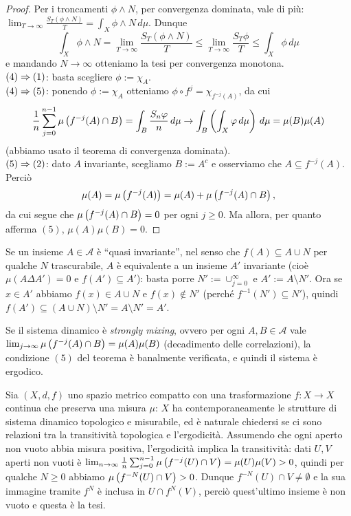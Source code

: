 \begin{proof}
Per i troncamenti $\phi\wedge N$, per convergenza dominata, vale di più: $\lim_{T\to\infty}\frac{S_T(\phi\wedge N)}{T}=\int_X \phi\wedge N\,d\mu$. Dunque
\[ \int_X\phi\wedge N=\lim_{T\to\infty}\frac{S_T(\phi\wedge N)}{T}\le\lim_{T\to\infty}\frac{S_T\phi}{T}\le \int_X\phi\,d\mu \]
e mandando $N\to\infty$ otteniamo la tesi per convergenza monotona. \\
$(4)\Rightarrow (1)$: basta scegliere $\phi:=\chi_A$. \\
$(4)\Rightarrow(5)$: ponendo $\phi:=\chi_A$ otteniamo $\phi\circ f^j=\chi_{f^{-j}(A)}$, da cui
\[ \frac{1}{n}\sum_{j=0}^{n-1}\mu\left(f^{-j}(A)\cap B\right)=\int_B\frac{S_n\varphi}{n}\,d\mu\to\int_B\left(\int_X\varphi\,d\mu\right)\,d\mu=\mu(B)\mu(A) \]
(abbiamo usato il teorema di convergenza dominata). \\
$(5)\Rightarrow (2)$: dato $A$ invariante, scegliamo $B:=A^c$ e osserviamo che $A\subseteq f^{-j}(A)$. Perciò
\[ \mu(A)=\mu\left(f^{-j}(A)\right)=\mu(A)+\mu\left(f^{-j}(A)\cap B\right), \]
da cui segue che $\mu\left(f^{-j}(A)\cap B\right)=0$ per ogni $j\ge 0$. Ma allora, per quanto afferma $(5)$, $\mu(A)\mu(B)=0$.
\end{proof}

\begin{oss}Se un insieme $A\in\mathcal{A}$ è ``quasi invariante'', nel senso che $f(A)\subseteq A\cup N$ per qualche
$N$ trascurabile, $A$ è equivalente a un insieme $A'$ invariante (cioè $\mu(A\Delta A')=0$ e $f(A')\subseteq A'$):
basta porre $N':=\cup_{j=0}^\infty$ e $A':=A\setminus N'$. Ora se $x\in A'$ abbiamo
$f(x)\in A\cup N$ e $f(x)\nin N'$ (perché $f^{-1}(N')\subseteq N'$), quindi $f(A')\subseteq (A\cup N)\setminus N'=A\setminus N'=A'$.
\end{oss}

\begin{oss}Se il sistema dinamico è \emph{strongly mixing}, ovvero per ogni $A,B\in\mathcal{A}$ vale
$\lim_{j\to\infty}\mu\left(f^{-j}(A)\cap B\right)=\mu(A)\mu(B)$ (\lcap decadimento delle correlazioni\rcap),
la condizione $(5)$ del teorema è banalmente verificata, e quindi il sistema è ergodico.
\end{oss}

\begin{oss}[facoltativa]Sia $(X,d,f)$ uno spazio metrico compatto con una trasformazione $f:X\to X$ continua che preserva
una misura $\mu$: $X$ ha contemporaneamente le strutture di sistema dinamico topologico
e misurabile, ed è naturale chiedersi se ci sono relazioni tra la transitività topologica e l'ergodicità.
Assumendo che ogni aperto non vuoto abbia misura positiva, l'ergodicità implica la transitività:
dati $U,V$ aperti non vuoti è $\lim_{n\to\infty}\frac{1}{n}\sum_{j=0}^{n-1}\mu\left(f^{-j}(U)\cap V\right)=\mu(U)\mu(V)>0$,
quindi per qualche $N\ge 0$ abbiamo $\mu\left(f^{-N}(U)\cap V\right)>0$.
Dunque $f^{-N}(U)\cap V\neq\emptyset$ e la sua immagine tramite $f^N$ è inclusa in $U\cap f^N(V)$, perciò
quest'ultimo insieme è non vuoto e questa è la tesi.
\end{oss}

